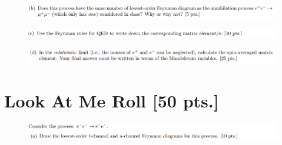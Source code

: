 \documentclass[11pt]{article}
\theoremstyle{definition}
\numberwithin{equation}{section}
\begin{document}
\newpage



\begin{figure}[H]
    \centering
    \includegraphics[scale = 0.4]{1b.png}
\end{figure}


\newpage



\begin{figure}[H]
    \centering
    \includegraphics[scale = 0.4]{1c.png}
\end{figure}


\newpage


\begin{figure}[H]
    \centering
    \includegraphics[scale = 0.4]{1d.png}
\end{figure}


\newpage


\section{\textbf{Look At Me Roll} [50 pts.]}

\begin{figure}[H]
    \centering
    \includegraphics[scale = 0.4]{2a.png}
\end{figure}
\end{document}
